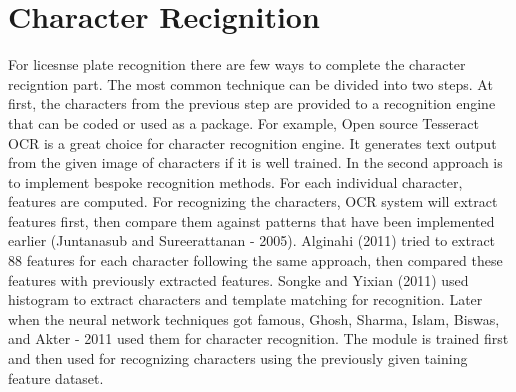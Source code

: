 \section{Character Recignition}

For licesnse plate recognition there are few ways to complete the character recigntion part. The most common technique can be divided into two steps. At first, the characters from the previous step are provided to a recognition engine that can be coded or used as a package. For example, Open source Tesseract OCR is a great choice for character recognition engine. It generates text output from the given image of characters if it is well trained. In the second approach is to implement bespoke recognition methods. For each individual character, features are computed. For recognizing the characters, OCR system will extract features first, then compare them against patterns that have been implemented earlier (Juntanasub and Sureerattanan - 2005). Alginahi (2011) tried  to extract 88 features for each character following the same approach, then compared these features with previously extracted features. Songke and Yixian (2011) used histogram to extract characters and template matching for recognition. Later when the neural network techniques got famous, Ghosh, Sharma, Islam, Biswas, and Akter - 2011 used them for character recognition. The module is trained first and then used for recognizing characters using the previously given taining feature dataset.